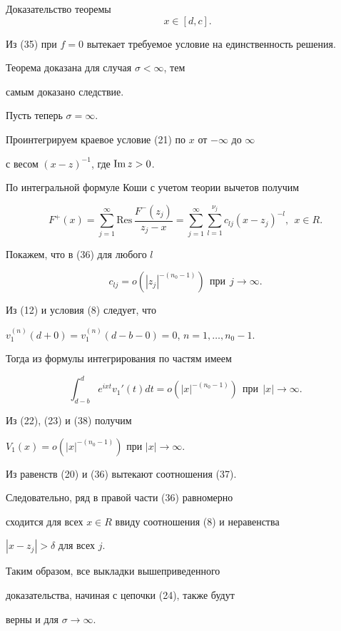 \begin{pf*}{Доказательство теоремы}
\begin{equation}
\ \ x\in [d,c].


\end{equation}


Из (35) при $f=0$ вытекает требуемое условие на единственность решения.


Теорема доказана для случая $\sigma<\infty$, тем


самым доказано следствие.





Пусть теперь $\sigma =\infty$.


Проинтегрируем краевое условие (21) по $x$ от $-\infty$ до $\infty$


с весом $(x-z)^{-1}$, где $\operatorname{Im} z>0$.


По интегральной формуле Коши с учетом теории вычетов получим


\begin{equation}


F^+(x)=\sum_{j=1}^{\infty} \mathrm{Res}\, \frac{F^-(z_j)}{z_j-x}=


\sum_{j=1}^{\infty} \sum_{l=1}^{\nu_j}c_{lj}


(x-z_j)^{-l},\ \ x\in R.


\end{equation}


Покажем, что в (36) для любого $l$


\begin{equation}


c_{lj}=o(|z_j|^{-(n_0-1)})\ \ \text{при}\ \ j\to \infty.


\end{equation}


Из (12) и условия (8) следует, что


$v_1^{(n)}(d+0)=v_1^{(n)}(d-b-0)=0$, $n=1,\dotsc,n_0-1$.


Тогда из формулы интегрирования по частям имеем


\begin{equation}


\int_{d-b}^{d}


e^{ixt}v_1'(t)dt=o(|x|^{-(n_0-1)})\ \ \text{при}\ \ |x|\to\infty.


\end{equation}


Из (22), (23) и (38) получим


$V_1(x)=o(|x|^{-(n_0-1)})$ при $|x|\to\infty$.


Из равенств (20) и (36) вытекают соотношения (37).


Следовательно, ряд в правой части (36) равномерно


сходится для всех $x\in R$ ввиду соотношения (8) и неравенства


$|x-z_j|>\delta$ для  всех $j$.


Таким образом, все выкладки вышеприведенного


доказательства, начиная с цепочки (24), также будут


верны и для $\sigma\to \infty$.


\end{pf*}





